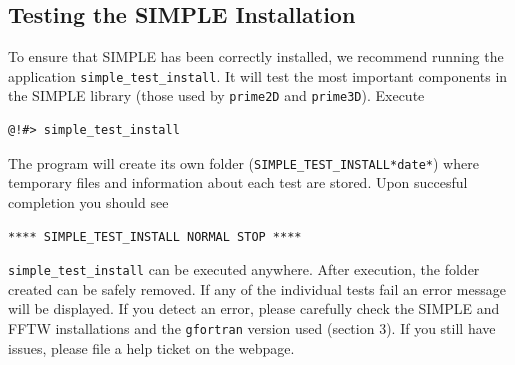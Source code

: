 \documentclass[a4paper,11pt]{article}
\newcommand{\prgname}[1]{\textcolor{NavyBlue}{\texttt{#1}}}
\begin{document}
\subsection{Testing the SIMPLE Installation}
To ensure that SIMPLE has been correctly installed, we recommend running the application \prgname{simple\_test\_install}. It will test the most important components in the SIMPLE library  (those used by \prgname{prime2D} and \prgname{prime3D}). Execute
\begin{verbatim}
@!#> simple_test_install 
\end{verbatim}
The program will create its own folder (\texttt{SIMPLE\_TEST\_INSTALL*date*}) where temporary files and information about each test are stored. Upon succesful completion you should see
\begin{verbatim}
**** SIMPLE_TEST_INSTALL NORMAL STOP ****
\end{verbatim}
\prgname{simple\_test\_install} can be executed anywhere. After execution, the folder created can be safely removed. If any of the individual tests fail an error message will be displayed. If you detect an error, please carefully check the SIMPLE and FFTW installations and the \texttt{gfortran} version used (section 3). If you still have issues, please file a help ticket on the webpage.
\end{document}
